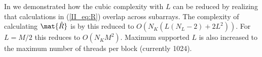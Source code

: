 In \cite{Asen2012, Buskenes2015} we demonstrated how the cubic complexity with $L$ %
can be reduced by realizing that calculations in (\ref{II_eq:R}) overlap across subarrays. %
The complexity of calculating $\mat{\hat{R}}$ is by this reduced to $O(N_K(L(N_L-2)+2L^2))$. For $L=M/2$ this reduces to $O(N_KM^2)$.
Maximum supported $L$ is also increased to the maximum number of threads per block (currently 1024). %


